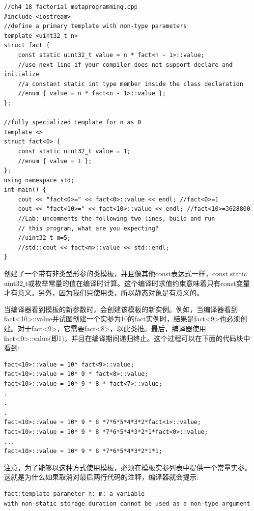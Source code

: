 \begin{lstlisting}[caption={}]
//ch4_18_factorial_metaprogramming.cpp
#include <iostream>
//define a primary template with non-type parameters
template <uint32_t n>
struct fact {
	const static uint32_t value = n * fact<n - 1>::value;
	//use next line if your compiler does not support declare and initialize
	//a constant static int type member inside the class declaration
	//enum { value = n * fact<n - 1>::value };
};

//fully specialized template for n as 0
template <>
struct fact<0> {
	const static uint32_t value = 1;
	//enum { value = 1 };
};
using namespace std;
int main() {
	cout << "fact<0>=" << fact<0>::value << endl; //fact<0>=1
	cout << "fact<10>=" << fact<10>::value << endl; //fact<10>=3628800
	//Lab: uncomments the following two lines, build and run
	// this program, what are you expecting?
	//uint32_t m=5;
	//std::cout << fact<m>::value << std::endl;
}
\end{lstlisting}

创建了一个带有非类型形参的类模板，并且像其他const表达式一样，const static uint32\underline{ }t或枚举常量的值在编译时计算。这个编译时求值约束意味着只有const变量才有意义。另外，因为我们只使用类，所以静态对象是有意义的。 \par
当编译器看到模板的新参数时，会创建该模板的新实例。例如，当编译器看到fact<10>::value并试图创建一个实参为10的fact实例时，结果是fact<9>也必须创建。对于fact<9>，它需要fact<8>，以此类推。最后，编译器使用fact<0>::value(即1)，并且在编译期间递归终止。这个过程可以在下面的代码块中看到:\par

\begin{lstlisting}[caption={}]
fact<10>::value = 10* fact<9>::value;
fact<10>::value = 10* 9 * fact<8>::value;
fact<10>::value = 10* 9 * 8 * fact<7>::value;
.
.
.
fact<10>::value = 10* 9 * 8 *7*6*5*4*3*2*fact<1>::value;
fact<10>::value = 10* 9 * 8 *7*6*5*4*3*2*1*fact<0>::value;
...
fact<10>::value = 10* 9 * 8 *7*6*5*4*3*2*1*1;
\end{lstlisting}

注意，为了能够以这种方式使用模板，必须在模板实参列表中提供一个常量实参。这就是为什么如果取消对最后两行代码的注释，编译器就会提示: \par

\begin{lstlisting}[caption={}]
fact:template parameter n: m: a variable
with non-static storage duration cannot be used as a non-type argument  \end{lstlisting}

